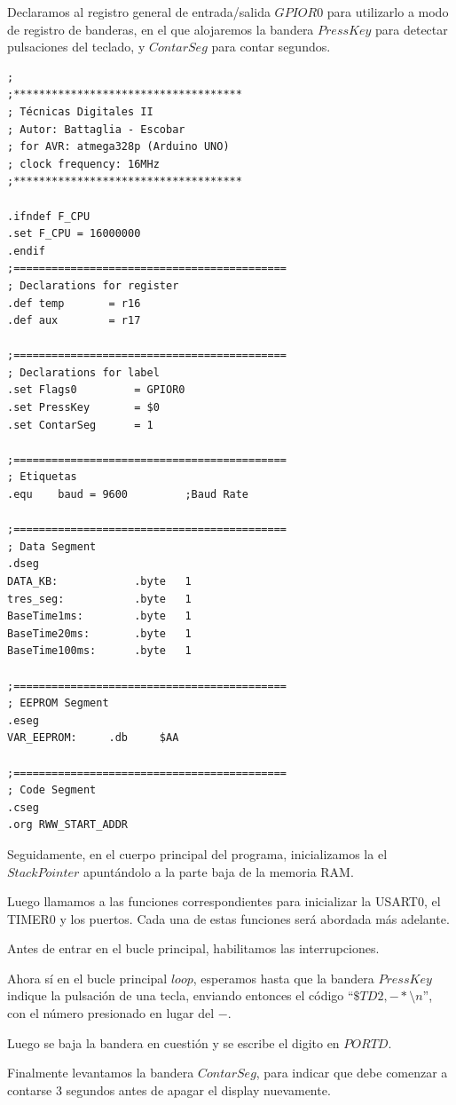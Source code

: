 \documentclass[a4paper, 12pt]{article}
\begin{document}
Declaramos al registro general de entrada/salida $GPIOR0$ para utilizarlo a modo de registro de banderas, en el que alojaremos la bandera $PressKey$ para detectar pulsaciones del teclado, y $ContarSeg$ para contar segundos.
\begin{lstlisting}
;
;************************************
; Técnicas Digitales II 
; Autor: Battaglia - Escobar
; for AVR: atmega328p (Arduino UNO)
; clock frequency: 16MHz 
;************************************

.ifndef F_CPU
.set F_CPU = 16000000
.endif
;===========================================
; Declarations for register
.def temp 		= r16
.def aux		= r17

;===========================================
; Declarations for label
.set Flags0			= GPIOR0
.set PressKey		= $0
.set ContarSeg		= 1

;===========================================
; Etiquetas
.equ	baud = 9600			;Baud Rate

;===========================================
; Data Segment
.dseg
DATA_KB:			.byte	1
tres_seg:			.byte	1
BaseTime1ms:		.byte	1
BaseTime20ms:		.byte	1
BaseTime100ms:		.byte	1

;===========================================
; EEPROM Segment
.eseg
VAR_EEPROM:		.db		$AA

;===========================================
; Code Segment
.cseg
.org RWW_START_ADDR 
\end{lstlisting}

Seguidamente, en el cuerpo principal del programa, inicializamos la el $Stack Pointer$ apuntándolo a la parte baja de la memoria RAM.

Luego llamamos a las funciones correspondientes para inicializar la USART0, el TIMER0 y los puertos. Cada una de estas funciones será abordada más adelante.

Antes de entrar en el bucle principal, habilitamos las interrupciones.

Ahora sí en el bucle principal $loop$, esperamos hasta que la bandera $PressKey$ indique la pulsación de una tecla, enviando entonces el código ``$\$TD2,-*\setminus n$'', con el número presionado en lugar del $-$.

Luego se baja la bandera en cuestión y se escribe el digito en $PORTD$.

Finalmente levantamos la bandera $ContarSeg$, para indicar que debe comenzar a contarse 3 segundos antes de apagar el display nuevamente.
\end{document}
